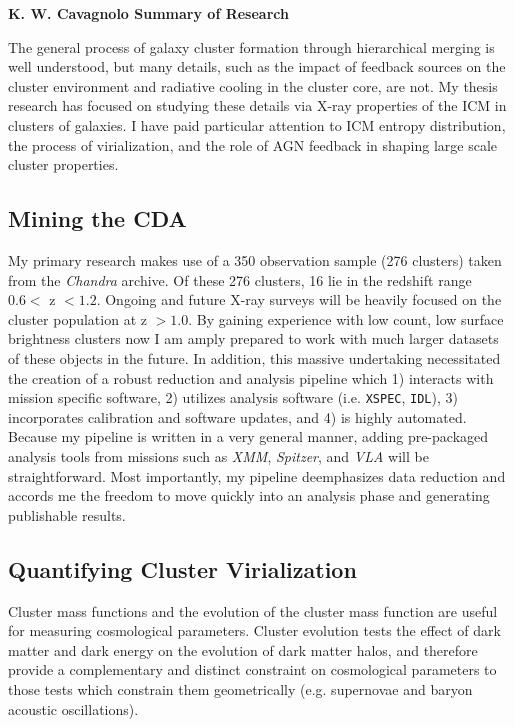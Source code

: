 \documentclass[11pt]{article}
\newcommand{\sekshun}[1]
{
\markboth{\hfill \bf{K. W. Cavagnolo}{#1} \bf{Summary of Research} \hfill}
	 {\hfill \bf{K. W. Cavagnolo}{#1} \bf{Summary of Research} \hfill}
}
\begin{document}
\sekshun{}
The general process of galaxy cluster formation through hierarchical
merging is well understood, but many details, such as the impact of
feedback sources on the cluster environment and radiative cooling in
the cluster core, are not. My thesis research has focused on studying
these details via X-ray properties of the ICM in clusters of
galaxies. I have paid particular attention to ICM entropy
distribution, the process of virialization, and the role of AGN
feedback in shaping large scale cluster properties.

\subsection*{Mining the CDA}

My primary research makes use of a 350 observation sample (276
clusters) taken from the {\textit{Chandra}} archive. Of these 276
clusters, 16 lie in the redshift range $0.6 <$ z $< 1.2$. Ongoing and
future X-ray surveys will be heavily focused on the cluster population
at z $> 1.0$. By gaining experience with low count, low surface
brightness clusters now I am amply prepared to work with much larger
datasets of these objects in the future. In addition, this massive
undertaking necessitated the creation of a robust reduction and
analysis pipeline which 1) interacts with mission specific software,
2) utilizes analysis software (i.e. {\tt{XSPEC}}, {\tt{IDL}}), 3)
incorporates calibration and software updates, and 4) is highly
automated. Because my pipeline is written in a very general manner,
adding pre-packaged analysis tools from missions such as
{\textit{XMM}}, {\textit{Spitzer}}, and {\textit{VLA}} will be
straightforward. Most importantly, my pipeline deemphasizes data
reduction and accords me the freedom to move quickly into an analysis
phase and generating publishable results.

\subsection*{Quantifying Cluster Virialization}

Cluster mass functions and the evolution of the cluster mass function
are useful for measuring cosmological parameters. Cluster evolution
tests the effect of dark matter and dark energy on the evolution of
dark matter halos, and therefore provide a complementary and distinct
constraint on cosmological parameters to those tests which constrain
them geometrically (e.g. supernovae and baryon acoustic
oscillations).
\end{document}
